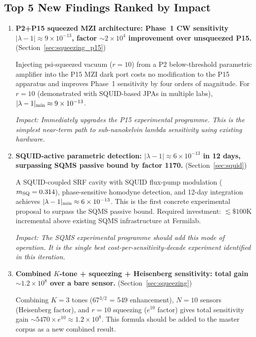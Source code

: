 \documentclass[11pt,twocolumn]{article}
\newcommand{\lam}{\lambda}
\begin{document}
\subsection{Top 5 New Findings Ranked by Impact}
\label{sec:top5}

\begin{enumerate}

\item \textbf{P2+P15 squeezed MZI architecture: Phase~1 CW sensitivity
$|\lam-1| \approx 9\times10^{-13}$, factor $\sim 2\times10^4$
improvement over unsqueezed P15.}
(Section~\ref{sec:squeezing_p15})

Injecting psi-squeezed vacuum ($r = 10$) from a P2 below-threshold
parametric amplifier into the P15 MZI dark port costs no modification
to the P15 apparatus and improves Phase~1 sensitivity by four orders
of magnitude. For $r = 10$ (demonstrated with SQUID-based JPAs in
multiple labs), $|\lam-1|_{\rm min} \approx 9\times10^{-13}$.

\emph{Impact: Immediately upgrades the P15 experimental programme.
This is the simplest near-term path to sub-nanokelvin lambda sensitivity
using existing hardware.}

\item \textbf{SQUID-active parametric detection: $|\lam-1| \approx
6\times10^{-13}$ in 12 days, surpassing SQMS passive bound by factor
1170.}
(Section~\ref{sec:squid})

A SQUID-coupled SRF cavity with SQUID flux-pump modulation
($m_{\rm SQ} = 0.314$), phase-sensitive homodyne detection, and
12-day integration achieves $|\lam-1|_{\rm min} \approx 6\times10^{-13}$.
This is the first concrete experimental proposal to surpass the SQMS
passive bound. Required investment: $\lesssim\$100$K incremental above
existing SQMS infrastructure at Fermilab.

\emph{Impact: The SQMS experimental programme should add this mode
of operation. It is the single best cost-per-sensitivity-decade
experiment identified in this iteration.}

\item \textbf{Combined $K$-tone + squeezing + Heisenberg sensitivity:
total gain $\sim 1.2\times10^8$ over a bare sensor.}
(Section~\ref{sec:squeezing})

Combining $K = 3$ tones (67$^{3/2}$ = 549 enhancement), $N = 10$
sensors (Heisenberg factor), and $r = 10$ squeezing ($e^{10}$ factor)
gives total sensitivity gain $\sim 5470 \times e^{10} \approx
1.2\times10^8$. This formula should be added to the master corpus
as a new combined result.


\end{enumerate}
\end{document}
